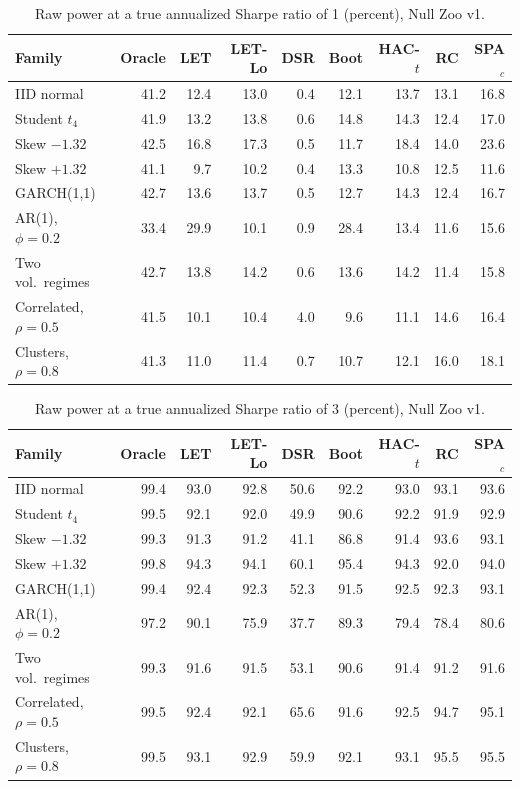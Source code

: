 \begin{table}[t]
\centering
\small
\caption{Raw power at a true annualized Sharpe ratio of 1 (percent), Null Zoo v1.}
\label{tab:power-1}
\begin{tabular}{lrrrrrrrr}
\toprule
Family & Oracle & LET & LET-Lo & DSR & Boot & HAC-$t$ & RC & SPA$_c$ \\
\midrule
IID normal & 41.2 & 12.4 & 13.0 & 0.4 & 12.1 & 13.7 & 13.1 & 16.8 \\
Student $t_4$ & 41.9 & 13.2 & 13.8 & 0.6 & 14.8 & 14.3 & 12.4 & 17.0 \\
Skew $-1.32$ & 42.5 & 16.8 & 17.3 & 0.5 & 11.7 & 18.4 & 14.0 & 23.6 \\
Skew $+1.32$ & 41.1 & 9.7 & 10.2 & 0.4 & 13.3 & 10.8 & 12.5 & 11.6 \\
GARCH(1,1) & 42.7 & 13.6 & 13.7 & 0.5 & 12.7 & 14.3 & 12.4 & 16.7 \\
AR(1), $\phi=0.2$ & 33.4 & 29.9 & 10.1 & 0.9 & 28.4 & 13.4 & 11.6 & 15.6 \\
Two vol.\ regimes & 42.7 & 13.8 & 14.2 & 0.6 & 13.6 & 14.2 & 11.4 & 15.8 \\
Correlated, $\rho=0.5$ & 41.5 & 10.1 & 10.4 & 4.0 & 9.6 & 11.1 & 14.6 & 16.4 \\
Clusters, $\rho=0.8$ & 41.3 & 11.0 & 11.4 & 0.7 & 10.7 & 12.1 & 16.0 & 18.1 \\
\bottomrule
\end{tabular}
\end{table}

\begin{table}[t]
\centering
\small
\caption{Raw power at a true annualized Sharpe ratio of 3 (percent), Null Zoo v1.}
\label{tab:power-3}
\begin{tabular}{lrrrrrrrr}
\toprule
Family & Oracle & LET & LET-Lo & DSR & Boot & HAC-$t$ & RC & SPA$_c$ \\
\midrule
IID normal & 99.4 & 93.0 & 92.8 & 50.6 & 92.2 & 93.0 & 93.1 & 93.6 \\
Student $t_4$ & 99.5 & 92.1 & 92.0 & 49.9 & 90.6 & 92.2 & 91.9 & 92.9 \\
Skew $-1.32$ & 99.3 & 91.3 & 91.2 & 41.1 & 86.8 & 91.4 & 93.6 & 93.1 \\
Skew $+1.32$ & 99.8 & 94.3 & 94.1 & 60.1 & 95.4 & 94.3 & 92.0 & 94.0 \\
GARCH(1,1) & 99.4 & 92.4 & 92.3 & 52.3 & 91.5 & 92.5 & 92.3 & 93.1 \\
AR(1), $\phi=0.2$ & 97.2 & 90.1 & 75.9 & 37.7 & 89.3 & 79.4 & 78.4 & 80.6 \\
Two vol.\ regimes & 99.3 & 91.6 & 91.5 & 53.1 & 90.6 & 91.4 & 91.2 & 91.6 \\
Correlated, $\rho=0.5$ & 99.5 & 92.4 & 92.1 & 65.6 & 91.6 & 92.5 & 94.7 & 95.1 \\
Clusters, $\rho=0.8$ & 99.5 & 93.1 & 92.9 & 59.9 & 92.1 & 93.1 & 95.5 & 95.5 \\
\bottomrule
\end{tabular}
\end{table}

